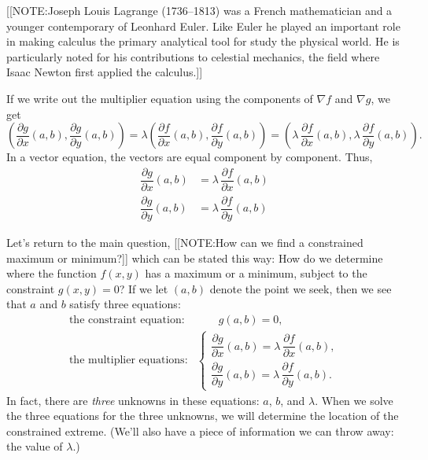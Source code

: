 [[NOTE:Joseph Louis Lagrange (1736--1813) was a
  French mathematician and a younger contemporary of Leonhard
  Euler.  Like Euler he played an important role in
  making calculus the primary analytical tool for study the physical
  world.  He is particularly noted for his contributions to celestial
  mechanics, the field where Isaac
  Newton first applied the calculus.]]

If we write out the multiplier equation using the components of
$\nabla f$ and $\nabla g$, we get
        \[
\left(\dfrac{\partial g}{\partial x}(a, b), 
                \dfrac{\partial g}{\partial y}(a, b) \right) =
                \lambda \left(\dfrac{\partial f}{\partial x}(a, b), 
                \dfrac{\partial f}{\partial y}(a, b) \right) = 
                \left(\lambda \, \dfrac{\partial f}{\partial x}(a, b), 
                \lambda \, \dfrac{\partial f}{\partial y}(a, b) \right).
\]
In a vector equation, the vectors are equal component by component.  Thus,
\begin{align*}
\dfrac{\partial g}{\partial x}(a, b) &=
       \lambda \, \dfrac{\partial f}{\partial x}(a, b) \\[4pt]
\dfrac{\partial g}{\partial y}(a, b) &=
       \lambda \, \dfrac{\partial f}{\partial y}(a, b) 
\end{align*}


Let's return to the main question, 
[[NOTE:How can we find a constrained maximum or minimum?]] 
which can be stated this way: How do we determine where the function
$f(x, y)$ has a maximum or a minimum, subject to the constraint $g(x,
y) = 0$?  If we let $(a, b)$ denote the point we seek, then we see
that $a$ and $b$ satisfy three equations:
\[
\begin{array}{rl}
 \mbox{the constraint equation}: & \hspace{24pt} g(a, b) = 0,     \\[7pt]
 \mbox{the multiplier equations}: &
                \left\{
                \begin{array}{l}
                \dfrac{\partial g}{\partial x}(a, b) = 
                        \lambda \, 
                \dfrac{\partial f}{\partial x}(a, b), \\[14pt]
                \dfrac{\partial g}{\partial y}(a, b) = 
                        \lambda \, 
                        \dfrac{\partial f}{\partial y}(a, b).
                 \end{array}
                 \right.
        \end{array}
\]
In fact, there are {\em three\/} unknowns in these equations: $a$,
$b$, and $\lambda$.  When we solve the three equations for the three
unknowns, we will determine the location of the constrained extreme.
(We'll also have a piece of information we can throw away: the value
of $\lambda$.)




